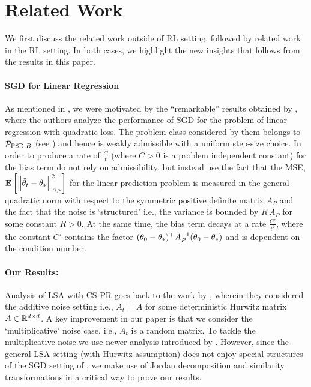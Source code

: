 \section{Related Work}
We first discuss the related work outside of RL setting, followed by related work in the RL setting. In both cases, we highlight the new insights that follows from the results in this paper.\par
\paragraph{SGD for Linear Regression} As mentioned in , we were motivated by the ``remarkable'' results obtained by \citet{bach}, where the authors analyze the performance of SGD for the problem of linear regression with quadratic loss. The problem class considered by them belongs to $\P_{\text{PSD},B}$ (see  ) and hence is weakly admissible with a uniform step-size choice. In order to produce a rate of $\frac{C}{t}$ (where $C>0$ is a problem independent constant) for the bias term \citet{bach} do not rely on admissibility, but instead use the fact that the MSE, $\EE{\norm{\thh_t-\ts}^2_{A_P}}$ for the linear prediction problem is measured in the general quadratic norm with respect to the symmetric positive definite matrix $A_P$ and the fact that the noise is `structured' i.e., the variance is bounded by $R\,A_P$ for some constant $R>0$. At the same time, the bias term decays at a rate $\frac{C'}{t^2}$, where the constant $C'$ contains the factor $(\theta_0-\ts)^\top A^{-1}_P (\theta_0-\ts)$ and is dependent on the condition number.
\paragraph{Our Results:} Analysis of LSA with CS-PR goes back to the work by \citet{polyak-judisky}, wherein they considered the additive noise setting i.e., $A_t=A$ for some deterministic Hurwitz matrix $A\in \R^{\dcd}$.
A key improvement in our paper is that we consider the `multiplicative' noise case, i.e., $A_t$ is a random matrix. To tackle the multiplicative noise we use newer analysis introduced by \citet{bach}. However, since the general LSA setting (with Hurwitz assumption) does not enjoy special structures of the SGD setting of \citet{bach}, we make use of Jordan decomposition and similarity transformations in a critical way to prove our results.
